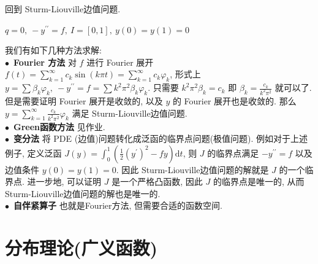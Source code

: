 \documentclass[11pt]{ctexart}[UTF8]
\begin{document}
回到 Sturm-Liouville边值问题.
\begin{example}
    $q = 0,\ -y^{\prime\prime} = f, \ I=[0,1],\ y(0)=y(1)=0$
\end{example}
我们有如下几种方法求解:\\
$\bullet$\ \textbf{Fourier 方法} 对 $f$ 进行 Fourier 展开 $f(t) = \sum\limits_{k=1}^{\infty} c_{k} \sin(k\pi t) = \sum\limits_{k=1}^{\infty} c_{k}\varphi_{k}$, 
形式上 $y = \sum\limits \beta_{k}\varphi_{k},\ -y^{\prime\prime} = f = \sum\limits k^2\pi^2\beta_{k} \varphi_{k}$. 只需要 $k^2\pi^2 \beta_{k} = c_{k}$ 即 $\beta_{k} = \frac{c_{k}}{k^2\pi^2}$ 就可以了. 但是需要证明 Fourier 展开是收敛的, 以及 $y$ 的 Fourier 展开也是收敛的.
那么 $y = \sum\limits_{k=1}^{\infty} \frac{c_{k}}{k^2\pi^2} \varphi_{k}$ 满足 Sturm-Liouville边值问题.\\
$\bullet$\ \textbf{Green函数方法} 见作业.\\
$\bullet$\ \textbf{变分法} 将 PDE (边值)问题转化成泛函的临界点问题(极值问题). 
例如对于上述例子, 定义泛函 $J(y) = \int_{0}^{1} \left( \frac{1}{2} (y^{\prime})^2 - f y \right) \mathrm{d}t$, 
则 $J$ 的临界点满足 $-y^{\prime\prime} = f$ 以及边值条件 $y(0)=y(1)=0$. 
因此 Sturm-Liouville边值问题的解就是 $J$ 的一个临界点. 进一步地, 可以证明 $J$ 是一个严格凸函数, 因此 $J$ 的临界点是唯一的, 从而 Sturm-Liouville边值问题的解也是唯一的.\\
$\bullet$\ \textbf{自伴紧算子} 也就是Fourier方法, 但需要合适的函数空间.
\newpage
\section{分布理论(广义函数)}
\end{document}
